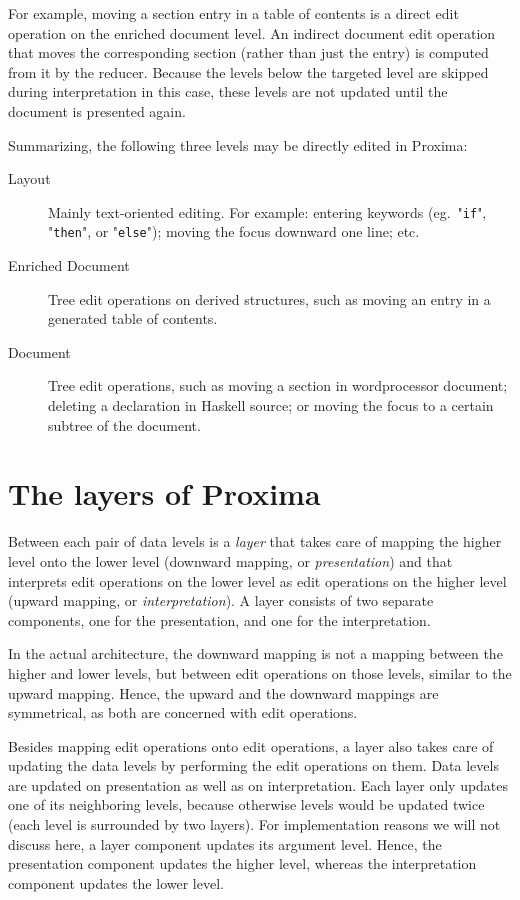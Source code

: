 \bc %
For example, moving a section entry in a table of contents is a direct edit operation on the enriched document level. An indirect document edit operation that moves the corresponding section (rather than just the entry) is computed from it by the reducer. Because the levels below the targeted level are skipped during interpretation in this case, these levels are not updated until the document is presented again.  \ec

\bigskip

Summarizing, the following three levels may be directly edited in Proxima:

\begin{description}
\item[Layout] Mainly text-oriented editing. For example: entering keywords (eg.\ "\verb|if|", "\verb|then|", or "\verb|else|"); moving the focus downward one line; etc.
\item[Enriched Document] Tree edit operations on derived structures, such as moving an entry in a generated table of contents.
\item[Document] Tree edit operations, such as moving a section in wordprocessor document; deleting a declaration in Haskell source; or moving the focus to a certain subtree of the document.
\end{description}






%																
%																
%																
\section{The layers of Proxima} \label{sect:archProximaLayers}

Between each pair of data levels is a {\em layer} that takes care of mapping the higher level onto the lower level (downward mapping, or {\em presentation}) and that interprets edit operations on the lower level as edit operations on the higher level (upward mapping, or {\em interpretation}). A layer consists of two separate components, one for the presentation, and one for the interpretation. 

In the actual architecture, the downward mapping is not a mapping between the higher and lower levels, but between edit operations on those levels, similar to the upward mapping. Hence, the upward and the downward mappings are symmetrical, as both are concerned with edit operations. 

Besides mapping edit operations onto edit operations, a layer also takes care of updating the data levels by performing the edit operations on them. Data levels are updated on presentation as well as on interpretation. Each layer only updates one of its neighboring levels, because otherwise levels would be updated twice (each level is surrounded by two layers). For implementation reasons we will not discuss here, a layer component updates its argument level. Hence, the presentation component updates the higher level, whereas the interpretation component updates the lower level. 

